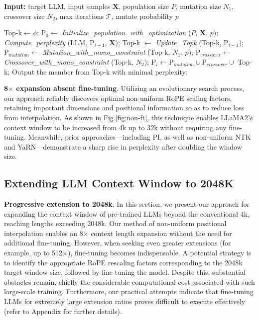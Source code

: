 \begin{algorithm}[t]
	\small
	\caption{The search algorithm}
	\textbf{Input:} target LLM, input samples $\mathbf{X}$,   population size $P$, mutation size $N_1$, crossover size $N_2$, max iterations $\mathcal{T}$, mutate probability $p$\\

	\begin{algorithmic}[1]
		\label{alg:search}
		\STATE Top-k$\leftarrow \phi$;	
		\STATE $\text{P}_0 \leftarrow$ \textit{Initialize\_population\_with\_optimization} ($P$, $\mathbf{X}$, $p$); 
		\STATE \textit{Compute\_perplexity} (LLM, $\text{P}_{i-1}$, $\mathbf{X}$);
		\STATE  Top-k $\leftarrow$ \textit{Update\_Topk} (Top-k, $\text{P}_{i-1}$);
		\STATE$\text{P}_{mutation} \leftarrow$ \textit{Mutation\_with\_mono\_constraint} (Top-k, $N_1$, $p$); 
		\STATE $\text{P}_{crossover} \leftarrow$ \textit{Crossover\_with\_mono\_constraint} (Top-k, $N_2$);
		\STATE $\text{P}_i \leftarrow \text{P}_{mutation} \cup \text{P}_{crossover} \cup$ Top-k;
		\ENDFOR
		\STATE Output the member from Top-k with minimal perplexity;
	\end{algorithmic}
\end{algorithm}

\textbf{8$\times$ expansion absent fine-tuning}. Utilizing an evolutionary search process, our approach reliably discovers optimal non-uniform RoPE scaling factors, retaining important dimensions and positional information so as to reduce loss from interpolation. As shown in Fig.\ref{fig:non-ft}, this technique enables LLaMA2’s context window to be increased from 4k up to 32k without requiring any fine-tuning. Meanwhile, prior approaches—including PI, as well as non-uniform NTK and YaRN—demonstrate a sharp rise in perplexity after doubling the window size.

\subsection{Extending LLM Context Window to 2048K}
\label{sec:extendto2048k}

\textbf{Progressive extension to 2048k}. In this section, we present our approach for expanding the context window of pre-trained LLMs beyond the conventional 4k, reaching lengths exceeding 2048k. Our method of non-uniform positional interpolation enables an 8$\times$ context length expansion without the need for additional fine-tuning. However, when seeking even greater extensions (for example, up to 512$\times$), fine-tuning becomes indispensable. A potential strategy is to identify the appropriate RoPE rescaling factors corresponding to the 2048k target window size, followed by fine-tuning the model. Despite this, substantial obstacles remain, chiefly the considerable computational cost associated with such large-scale training. Furthermore, our practical attempts indicate that fine-tuning LLMs for extremely large extension ratios proves difficult to execute effectively (refer to Appendix for further details).


